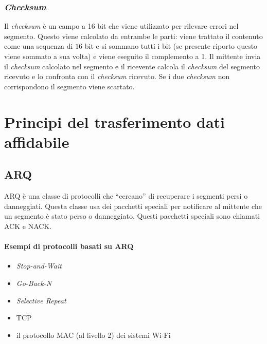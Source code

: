         \subsubsection{\textit{Checksum}}
            Il \textit{checksum} è un campo a 16 bit che viene utilizzato per rilevare errori nel segmento. Questo viene calcolato da entrambe le parti: viene trattato il contenuto come una sequenza di $ 16 $ bit e si sommano tutti i bit (se presente riporto questo viene sommato a sua volta) e viene eseguito il complemento a 1. Il mittente invia il \textit{checksum} calcolato nel segmento e il ricevente calcola il \textit{checksum} del segmento ricevuto e lo confronta con il \textit{checksum} ricevuto. Se i due \textit{checksum} non corrispondono il segmento viene scartato.
\section[Trasferimento dati affidabile]{Principi del trasferimento dati affidabile}
    \subsection[Automatic Repeat reQuest (\texttt{ARQ})]{\acrfull*{ARQ}}
        \acrfull*{ARQ} è una classe di protocolli che ``cercano'' di recuperare i segmenti persi o danneggiati. Questa classe usa dei pacchetti speciali per notificare al mittente che un segmento è stato perso o danneggiato. Questi pacchetti speciali sono chiamati \acrfull*{ACK} e \acrfull*{NACK}.
        \paragraph{Esempi di protocolli basati su \Acrshort*{ARQ}} \begin{itemize}
            \item \textit{Stop-and-Wait}
            \item \textit{Go-Back-N}
            \item \textit{Selective Repeat}
            \item \Acrshort*{TCP}
            \item il protocollo \Acrshort*{MAC} (al livello 2) dei sistemi \Acrshort*{Wi-Fi}
        \end{itemize}
